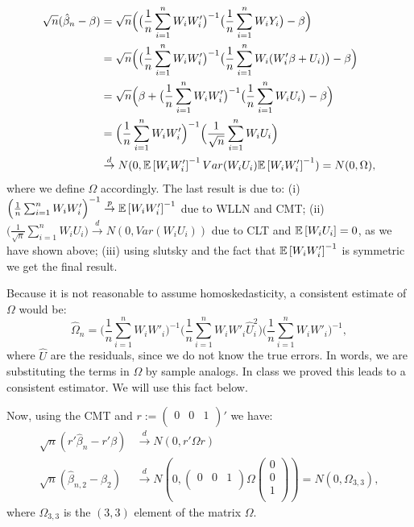 \documentclass[12pt]{paper}
\begin{document}
\begin{equation}
\begin{split}
\sqrt{n}(\hat{\beta}_n-\beta)&=\sqrt{n}\Big(\big(\frac{1}{n}\sum_{i=1}^{n}{W_iW'_i}\big)^{-1}\big(\frac{1}{n}\sum_{i=1}^{n}{W_iY_i}\big)-\beta\Big)\\
&=\sqrt{n}\Big(\big(\frac{1}{n}\sum_{i=1}^{n}{W_iW'_i}\big)^{-1}\big(\frac{1}{n}\sum_{i=1}^{n}{W_i(W'_i\beta+U_i)}\big)-\beta\Big)\\
&=\sqrt{n}\Big(\beta+\big(\frac{1}{n}\sum_{i=1}^{n}{W_iW'_i}\big)^{-1}\big(\frac{1}{n}\sum_{i=1}^{n}{W_iU_i}\big)-\beta\Big)\\
&=\Big(\frac{1}{n}\sum_{i=1}^{n}{W_iW'_i}\Big)^{-1}\Big(\frac{1}{\sqrt{n}}\sum_{i=1}^{n}{W_iU_i}\Big)\\
&\overset{d}{\to}N(0,\mathbb{E} \left [ W_iW'_i \right ]^{-1}Var(W_iU_i)\mathbb{E} \left [ W_iW'_i \right ]^{-1})=N(0,\Omega),
\end{split}
\end{equation}
\noindent where we define $\Omega$ accordingly. The last result is due to: (i) $\Big(\frac{1}{n}\sum_{i=1}^{n}{W_iW'_i}\Big)^{-1}\overset{p}{\to}\mathbb{E} \left [ W_iW'_i \right ]^{-1}$ due to WLLN and CMT; (ii) $\Big(\frac{1}{\sqrt{n}}\sum_{i=1}^{n}{W_iU_i}\Big)\overset{d}{\to}N(0,Var(W_iU_i))$ due to CLT and $\mathbb{E} \left [ W_iU_i \right ]=0$, as we have shown above; (iii) using slutsky and the fact that $\mathbb{E} \left [ W_iW'_i \right ]^{-1}$ is symmetric we get the final result.

Because it is not reasonable to assume homoskedasticity, a consistent estimate of $\Omega$ would be:
\begin{equation}
\hat{\Omega}_n=\Big(\frac{1}{n}\sum_{i=1}^{n}{W_iW'_i}\Big)^{-1}\Big(\frac{1}{n}\sum_{i=1}^{n}{W_iW'_i\hat{U}^2_i}\Big)\Big(\frac{1}{n}\sum_{i=1}^{n}{W_iW'_i}\Big)^{-1},
\end{equation}
\noindent where $\hat{U}$ are the residuals, since we do not know the true errors. In words, we are substituting the terms in $\Omega$ by sample analogs. In class we proved this leads to a consistent estimator. We will use this fact below.

Now, using the CMT and $r:=\begin{pmatrix}
0&0&1\\
\end{pmatrix}'$ we have:
\begin{equation}
\begin{split}
\sqrt{n}(r'\hat{\beta}_{n}-r'\beta)&\overset{d}{\to}N(0,r'\Omega r)\\
\sqrt{n}(\hat{\beta}_{n,2}-\beta_2)&\overset{d}{\to}N(0,\begin{pmatrix}
0&0&1\\
\end{pmatrix}
\Omega\begin{pmatrix}
0\\
0\\
1\\
\end{pmatrix})=N(0,\Omega_{3,3}),
\end{split}
\end{equation}
\noindent where $\Omega_{3,3}$ is the $(3,3)$ element of the matrix $\Omega$.
\end{document}
